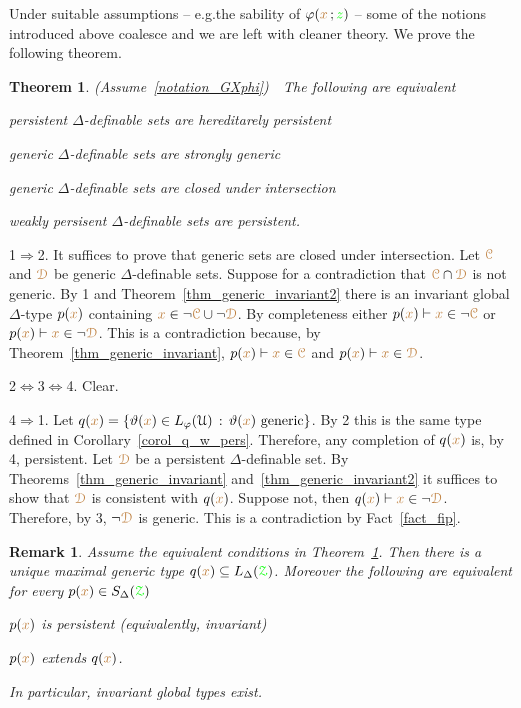 \documentclass[10pt,openany]{amsproc}
\makeatletter
\newcommand{\mylabel}[1]{{\ssf{#1}}\hfill}
\renewenvironment{itemize}
  {\begin{list}{}{%
   \setlength{\parskip}{0mm}
   \setlength{\topsep}{.2\baselineskip}
   \setlength{\rightmargin}{0mm}
   \setlength{\listparindent}{0mm}
   \setlength{\itemindent}{0mm}
   \setlength{\labelwidth}{2ex}
   \setlength{\itemsep}{.1\baselineskip}
   \setlength{\parsep}{0mm}
   \setlength{\partopsep}{0mm}
   \setlength{\labelsep}{1ex}
   \setlength{\leftmargin}{\labelwidth+\labelsep}
   \let\makelabel\mylabel
   }}
   {\vspace*{-.3\baselineskip}\end{list}}
\def\proves{\vdash}
\def\IMP{\Rightarrow}
\def\IFF{\Leftrightarrow}
\def\D{\EuScript D}
\def\Z{\EuScript Z}
\def\C{\EuScript C}
\def\U{\EuScript U}
\def\theta{\vartheta}
\def\phi{\varphi}
\def\ssf#1{\textsf{\small #1}}
\newcounter{thm}
\theoremstyle{mio}
\newtheorem{theorem}[thm]{Theorem}\tcolorboxenvironment{theorem}{mythm}
\newtheorem{remark}[thm]{Remark}\tcolorboxenvironment{remark}{mythm}
\providecommand{\proofNameStyle}{\bfseries}
\renewenvironment{proof}[1][\proofname]{\par
  \pushQED{\qed}%
  \normalfont%
  \trivlist
  \item[\hskip\labelsep
        \proofNameStyle
    #1\@addpunct{.}]\ignorespaces
}{%
  \popQED\endtrivlist\@endpefalse
}
\def\mr{\color{brown}}
\def\gr{\color{green}}
\def\mrC{{\mr\C}}
\def\mrD{{\mr\D}}
\def\grZ{{\gr\Z}}
\makeatother
\begin{document}
Under suitable assumptions -- e.g.\@ the sability of $\phi({\mr x}\,;{\gr z})$ -- some of the notions introduced above coalesce and we are left with cleaner theory.
We prove the following theorem.

\begin{theorem}\label{thm_coalesce}
  (Assume~\ref{notation_GXphi})\ \  
  The following are equivalent
  \begin{itemize}
    \item[1.] persistent $\Delta$-definable sets are hereditarely persistent
    \item[2.] generic $\Delta$-definable sets are strongly generic
    \item[3.] generic $\Delta$-definable sets are closed under intersection
    \item[4.] weakly persisent $\Delta$-definable sets are persistent.
  \end{itemize}
\end{theorem}

\begin{proof}
  \ssf1$\IMP$\ssf2.
  It suffices to prove that generic sets are closed under intersection.
  Let $\mrC$ and $\mrD$ be generic $\Delta$-definable sets.
  Suppose for a contradiction that $\mrC\cap\mrD$ is not generic.
  By \ssf1 and Theorem~\ref{thm_generic_invariant2} there is an invariant global $\Delta$-type $p({\mr x})$ containing ${\mr x}\in\neg\mrC\cup\neg\mrD$.
  By completeness either $p({\mr x})\proves{\mr x}\in\neg\mrC$ or $p({\mr x})\proves{\mr x}\in\neg\mrD$.
  This is a contradiction because, by Theorem~\ref{thm_generic_invariant}, $p({\mr x})\proves{\mr x}\in\mrC$ and $p({\mr x})\proves{\mr x}\in\mrD$.

  \ssf2$\IFF$\ssf3$\IFF$\ssf4. Clear.

  \ssf4$\IMP$\ssf1.
  Let $q({\mr x})=\{\theta({\mr x})\in L_\phi(\U)\,:\,\theta({\mr x})\textrm{ generic}\}$.
  By \ssf2 this is the same type defined in Corollary~\ref{corol_q_w_pers}.
  Therefore, any completion of $q({\mr x})$ is, by \ssf4, persistent.
  Let $\mrD$ be a persistent $\Delta$-definable set.
  By Theorems~\ref{thm_generic_invariant} and~\ref{thm_generic_invariant2} it suffices to show that $\mrD$ is consistent with $q({\mr x})$.
  Suppose not, then $q({\mr x})\proves {\mr x}\in\neg\mrD$.
  Therefore, by \ssf3, $\neg\mrD$ is generic.
  This is a contradiction by Fact~\ref{fact_fip}.
\end{proof}

\begin{remark}\label{rem_coalesce}
  Assume the equivalent conditions in Theorem~\ref{thm_coalesce}.
  Then there is a unique maximal generic type $q({\mr x})\subseteq L_\Delta(\grZ)$.
  Moreover the following are equivalent for every $p({\mr x})\in S_\Delta(\grZ)$
  \begin{itemize}
    \item[1.] $p({\mr x})$ is persistent (equivalently, invariant)
    \item[2.] $p({\mr x})$ extends $q({\mr x})$.
  \end{itemize}
  In particular, invariant global types exist.
\end{remark}
\end{document}
